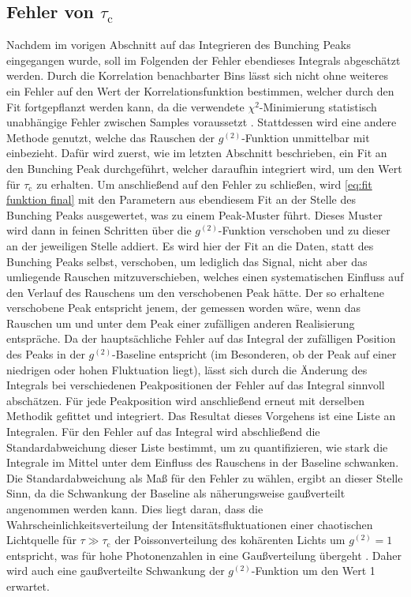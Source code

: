 \subsection{Fehler von \texorpdfstring{$\tau_{\mathrm{c}}$}{tc}}
\label{ssec:Fehler von tc}
Nachdem im vorigen Abschnitt auf das Integrieren des Bunching Peaks eingegangen wurde, soll im Folgenden der Fehler ebendieses Integrals abgeschätzt werden. 
Durch die Korrelation benachbarter Bins lässt sich nicht ohne weiteres ein Fehler auf den Wert der Korrelationsfunktion bestimmen, welcher durch den Fit fortgepflanzt werden kann, da die verwendete $\chi^2$-Minimierung statistisch unabhängige Fehler zwischen Samples voraussetzt \cite{vugrinConfidenceRegionEstimation2007}. 
Stattdessen wird eine andere Methode genutzt, welche das Rauschen der $g^{(2)}$-Funktion unmittelbar mit einbezieht. 
Dafür wird zuerst, wie im letzten Abschnitt beschrieben, ein Fit an den Bunching Peak durchgeführt, welcher daraufhin integriert wird, um den Wert für $\tau_{\mathrm{c}}$ zu erhalten. 
Um anschließend auf den Fehler zu schließen, wird \autoref{eq:fit funktion final} mit den Parametern aus ebendiesem Fit an der Stelle des Bunching Peaks ausgewertet, was zu einem Peak-Muster führt. 
Dieses Muster wird dann in feinen Schritten über die $g^{(2)}$-Funktion verschoben und zu dieser an der jeweiligen Stelle addiert. 
Es wird hier der Fit an die Daten, statt des Bunching Peaks selbst, verschoben, um lediglich das Signal, nicht aber das umliegende Rauschen mitzuverschieben, welches einen systematischen Einfluss auf den Verlauf des Rauschens um den verschobenen Peak hätte. 
Der so erhaltene verschobene Peak entspricht jenem, der gemessen worden wäre, wenn das Rauschen um und unter dem Peak einer zufälligen anderen Realisierung entspräche. 
Da der hauptsächliche Fehler auf das Integral der zufälligen Position des Peaks in der $g^{(2)}$-Baseline entspricht (im Besonderen, ob der Peak auf einer niedrigen oder hohen Fluktuation liegt), lässt sich durch die Änderung des Integrals bei verschiedenen Peakpositionen der Fehler auf das Integral sinnvoll abschätzen. 
Für jede Peakposition wird anschließend erneut mit derselben Methodik gefittet und integriert. 
Das Resultat dieses Vorgehens ist eine Liste an Integralen. 
Für den Fehler auf das Integral wird abschließend die Standardabweichung dieser Liste bestimmt, um zu quantifizieren, wie stark die Integrale im Mittel unter dem Einfluss des Rauschens in der Baseline schwanken. 
Die Standardabweichung als Maß für den Fehler zu wählen, ergibt an dieser Stelle Sinn, da die Schwankung der Baseline als näherungsweise gaußverteilt angenommen werden kann. 
Dies liegt daran, dass die Wahrscheinlichkeitsverteilung der Intensitätsfluktuationen einer chaotischen Lichtquelle für $\tau\gg \tau_{\mathrm{c}}$ der Poissonverteilung des kohärenten Lichts um $g^{(2)}=1$ entspricht, was für hohe Photonenzahlen in eine Gaußverteilung übergeht \cite[Kap. 5.5]{foxQuantumOpticsIntroduction2006}.
Daher wird auch eine gaußverteilte Schwankung der $g^{(2)}$-Funktion um den Wert 1 erwartet. \\

